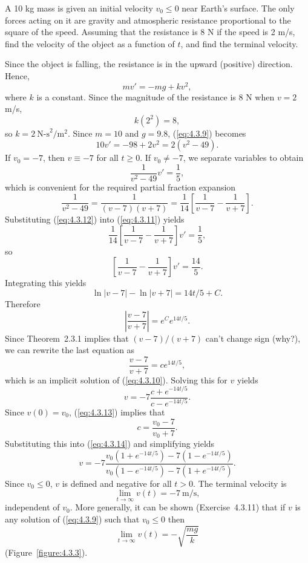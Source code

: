 \setcounter{example}{2}
\begin{example}
  \label{example:4.3.3} \rm A 10 kg mass is given an initial velocity $v_{0}\le0$ near Earth's
  surface. The only forces acting on it are gravity and atmospheric resistance proportional to the
  square of the speed. Assuming that the resistance is 8 N if the speed is 2 m/s, find the velocity
  of the object as a function of $t$, and find the terminal velocity.
\end{example}
\setcounter{equation}{8}
\setcounter{figure}{2}
\begin{examplesolution}
\solution Since the object is falling, the resistance is in the upward (positive) direction. Hence,
\begin{equation}
  \label{eq:4.3.9}mv'=-mg+kv^{2},
\end{equation}
where $k$ is a constant. Since the magnitude of the resistance is 8 N when $v=2$ m/s,
\[
  k(2^{2})=8,
\]
so $k=2\ \mbox{N-s}^{2}/\mbox{m}^{2}$. Since $m=10$ and $g=9.8$, (\ref{eq:4.3.9}) becomes
\begin{equation}
  \label{eq:4.3.10}10v'=-98+2v^{2}=2(v^{2}-49).
\end{equation}
If $v_{0}=-7$, then $v\equiv-7$ for all $t\ge0$. If $v_{0}\ne-7$, we separate variables to obtain
\begin{equation}
  \label{eq:4.3.11}\frac{1}{v^{2}-49}v'=\frac{1}{5},
\end{equation}
which is convenient for the required partial fraction expansion
\begin{equation}
  \label{eq:4.3.12}\frac{1}{v^{2}-49}=\frac{1}{(v-7)(v+7)}=\frac{1}{14}\left[\frac{1}{v-7}-\frac{1}{v+7}\right].
\end{equation}
Substituting (\ref{eq:4.3.12}) into (\ref{eq:4.3.11}) yields
\[
  \frac{1}{14}\left[\frac{1}{v-7}-\frac{1}{v+7}\right]v'=\frac{1}{5},
\]
so
\[
  \left[\frac{1}{v-7}-\frac{1}{v+7}\right]v'=\frac{14}{5}.
\]
Integrating this yields
\[
  \ln|v-7|-\ln|v+7|=14t/5+C.
\]
Therefore
\[
  \left|\frac{v-7}{v+7}\right|=e^{C}e^{14t/5}.
\]
Since Theorem~2.3.1 implies that $(v-7)/(v+7)$ can't change sign (why?), we can
rewrite the last equation as
\begin{equation}
  \label{eq:4.3.13}\frac{v-7}{v+7}=ce^{14t/5},
\end{equation}
which is an implicit solution of (\ref{eq:4.3.10}). Solving this for $v$ yields
\begin{equation}
  \label{eq:4.3.14}v=-7{\frac{c+e^{-14t/5}}{c-e^{-14t/5}}}.
\end{equation}
Since $v(0)=v_{0}$, (\ref{eq:4.3.13}) implies that
\[
  c=\frac{v_{0}-7}{v_{0}+7}.
\]
Substituting this into (\ref{eq:4.3.14}) and simplifying yields
\[
  v=-7{\frac{v_{0}(1+e^{-14t/5})-7(1-e^{-14t/5})}{v_{0}(1-e^{-14t/5})-7(1+e^{-14t/5})}}.
\]
Since $v_{0}\le0$, $v$ is defined and negative for all $t>0$. The terminal velocity is
\[
  \lim_{t\to\infty}v(t)=-7\ \mbox{m/s},
\]
independent of $v_{0}$. More generally, it can be shown (Exercise~4.3.11) that if $v$ is
any solution of (\ref{eq:4.3.9}) such that $v_{0}\le0$ then
\[
  \lim_{t\to\infty}v(t)=-\sqrt{\frac{mg}{k}}
\]
(Figure~\ref{figure:4.3.3}).


\end{examplesolution}
